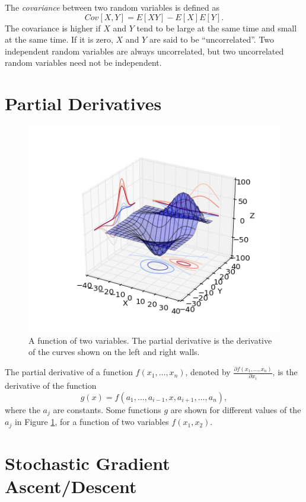 \documentclass{article}
\theoremstyle{definition}
\begin{document}
The {\em covariance} between two random variables is defined as 
$$Cov[X,Y] = E[XY] - E[X]E[Y].$$
The covariance is higher if $X$ and $Y$ tend to be large at the same
time and small at the same time. If it is zero, $X$ and $Y$ are said
to be ``uncorrelated''. Two independent random variables are always
uncorrelated, but two uncorrelated random variables need not be
independent.

\section{Partial Derivatives}

\begin{figure}
\includegraphics[width=\linewidth]{contour3d_demo3.png}
\caption{A function of two variables. The partial derivative is the
  derivative of the curves shown on the left and right walls.}
\label{fig-partial}
\end{figure}

The partial derivative of a function $f(x_1, \dots, x_n)$, denoted by
$\frac{\partial f(x_1, \dots, x_n)}{\partial x_i}$, is the derivative of
the function
$$g(x) = f(a_1, \dots, a_{i-1}, x, a_{i+1}, \dots, a_n),$$
where the $a_j$ are constants. Some functions $g$ are shown for
different values of the $a_j$ in Figure \ref{fig-partial}, for a
function of two variables $f(x_1, x_2)$.

\section{Stochastic Gradient Ascent/Descent}
\end{document}

